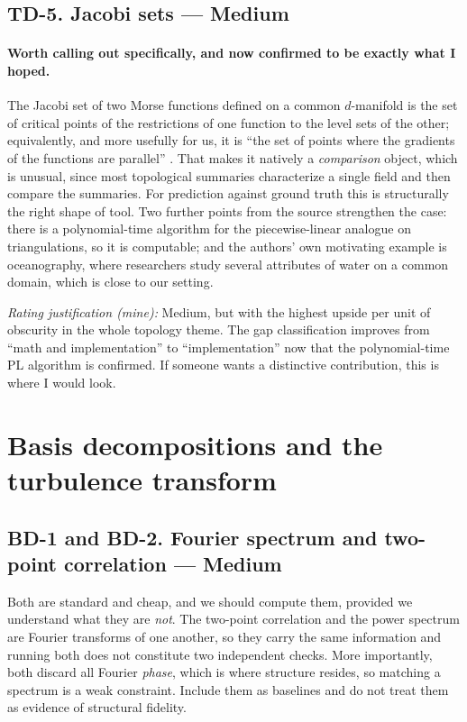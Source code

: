 \documentclass[11pt]{article}
\newcommand{\Med}{Medium}
\newcommand{\rating}[1]{\par\smallskip\noindent\textit{Rating justification (mine):} #1}
\begin{document}
\subsection{TD-5. Jacobi sets --- \Med{}}

\paragraph{Worth calling out specifically, and now confirmed to be exactly what I hoped.}
The Jacobi set of two Morse functions defined on a common $d$-manifold is the set of critical
points of the restrictions of one function to the level sets of the other; equivalently, and
more usefully for us, it is ``the set of points where the gradients of the functions are
parallel'' \cite{edelsbrunnerharer2004}. That makes it natively a \emph{comparison} object,
which is unusual, since most topological summaries characterize a single field and then
compare the summaries. For prediction against ground truth this is structurally the right
shape of tool. Two further points from the source strengthen the case: there is a
polynomial-time algorithm for the piecewise-linear analogue on triangulations, so it is
computable; and the authors' own motivating example is oceanography, where researchers study
several attributes of water on a common domain, which is close to our setting.

\rating{Medium, but with the highest upside per unit of obscurity in the whole topology
theme. The gap classification improves from ``math and implementation'' to
``implementation'' now that the polynomial-time PL algorithm is confirmed. If someone wants a
distinctive contribution, this is where I would look.}

\section{Basis decompositions and the turbulence transform}

\subsection{BD-1 and BD-2. Fourier spectrum and two-point correlation --- \Med{}}

Both are standard and cheap, and we should compute them, provided we understand what they
are \emph{not}. The two-point correlation and the power spectrum are Fourier transforms of
one another, so they carry the same information and running both does not constitute two
independent checks. More importantly, both discard all Fourier \emph{phase}, which is where
structure resides, so matching a spectrum is a weak constraint. Include them as baselines
and do not treat them as evidence of structural fidelity.
\end{document}
